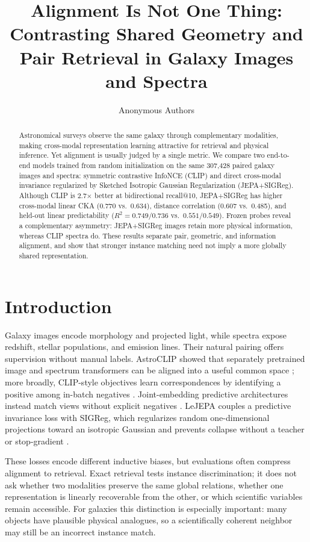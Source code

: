 \documentclass{article}
\title{Alignment Is Not One Thing:\\
Contrasting Shared Geometry and Pair Retrieval in Galaxy Images and Spectra}
\author{Anonymous Authors}
\begin{document}
\maketitle

\begin{abstract}
Astronomical surveys observe the same galaxy through complementary modalities, making cross-modal representation learning attractive for retrieval and physical inference.
Yet alignment is usually judged by a single metric.
We compare two end-to-end models trained from random initialization on the same 307,428 paired galaxy images and spectra: symmetric contrastive InfoNCE (CLIP) and direct cross-modal invariance regularized by Sketched Isotropic Gaussian Regularization (JEPA+SIGReg).
Although CLIP is 2.7$\times$ better at bidirectional recall@10, JEPA+SIGReg has higher cross-modal linear CKA (0.770 vs.\ 0.634), distance correlation (0.607 vs.\ 0.485), and held-out linear predictability ($R^2=0.749/0.736$ vs.\ $0.551/0.549$).
Frozen probes reveal a complementary asymmetry: JEPA+SIGReg images retain more physical information, whereas CLIP spectra do.
These results separate pair, geometric, and information alignment, and show that stronger instance matching need not imply a more globally shared representation.
\end{abstract}

\section{Introduction}

Galaxy images encode morphology and projected light, while spectra expose redshift, stellar populations, and emission lines.
Their natural pairing offers supervision without manual labels.
AstroCLIP showed that separately pretrained image and spectrum transformers can be aligned into a useful common space \citep{parker2024astroclip}; more broadly, CLIP-style objectives learn correspondences by identifying a positive among in-batch negatives \citep{radford2021clip}.
Joint-embedding predictive architectures instead match views without explicit negatives \citep{assran2023ijepa}.
LeJEPA couples a predictive invariance loss with SIGReg, which regularizes random one-dimensional projections toward an isotropic Gaussian and prevents collapse without a teacher or stop-gradient \citep{balestriero2025lejepa}.

These losses encode different inductive biases, but evaluations often compress alignment to retrieval.
Exact retrieval tests instance discrimination; it does not ask whether two modalities preserve the same global relations, whether one representation is linearly recoverable from the other, or which scientific variables remain accessible.
For galaxies this distinction is especially important: many objects have plausible physical analogues, so a scientifically coherent neighbor may still be an incorrect instance match.
\end{document}
